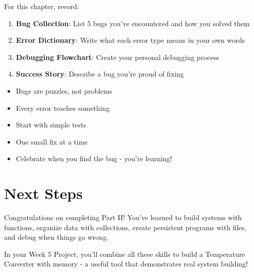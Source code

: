 \documentclass[
  letterpaper,
  DIV=11,
  numbers=noendperiod,
  oneside]{scrreprt}
\providecommand{\tightlist}{%
  \setlength{\itemsep}{0pt}\setlength{\parskip}{0pt}}\usepackage{longtable,booktabs,array}
\begin{document}
For this chapter, record:

\begin{enumerate}
\def\labelenumi{\arabic{enumi}.}
\tightlist
\item
  \textbf{Bug Collection}: List 5 bugs you've encountered and how you
  solved them
\item
  \textbf{Error Dictionary}: Write what each error type means in your
  own words
\item
  \textbf{Debugging Flowchart}: Create your personal debugging process
\item
  \textbf{Success Story}: Describe a bug you're proud of fixing
\end{enumerate}

\begin{tcolorbox}[enhanced jigsaw, opacityback=0, colback=white, colframe=quarto-callout-tip-color-frame, breakable, titlerule=0mm, coltitle=black, rightrule=.15mm, colbacktitle=quarto-callout-tip-color!10!white, left=2mm, bottomtitle=1mm, bottomrule=.15mm, title=\textcolor{quarto-callout-tip-color}{\faLightbulb}\hspace{0.5em}{Debugging Mindset}, opacitybacktitle=0.6, toptitle=1mm, leftrule=.75mm, arc=.35mm, toprule=.15mm]

\begin{itemize}
\tightlist
\item
  Bugs are puzzles, not problems
\item
  Every error teaches something
\item
  Start with simple tests
\item
  One small fix at a time
\item
  Celebrate when you find the bug - you're learning!
\end{itemize}

\end{tcolorbox}

\section{Next Steps}\label{next-steps-9}

Congratulations on completing Part II! You've learned to build systems
with functions, organize data with collections, create persistent
programs with files, and debug when things go wrong.

In your Week 5 Project, you'll combine all these skills to build a
Temperature Converter with memory - a useful tool that demonstrates real
system building!
\end{document}
